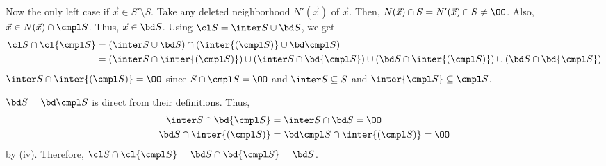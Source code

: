\documentclass[MAS241_Note.tex]{subfiles}
\begin{document}
{\begin{enumerate}[label=(\roman*), nolistsep]
            Now the only left case if $\vec x \in S' \setminus S$.
            Take any deleted neighborhood $N'(\vec x)$ of $\vec x$.
            Then, $N(\vec x) \cap S = N'(\vec x) \cap S \neq \OO$.
            Also, $\vec x \in N(\vec x) \cap \cmpl S$. Thus, $\vec x \in \bd S$.
        \ii Using $\cl S = \inter S \cup \bd S$, we get \[
                \begin{aligned}[t]
                    \cl S \cap \cl{\cmpl S} & = (\inter S \cup \bd S) \cap (\inter{(\cmpl S)} \cup \bd\cmpl S) \\
                                            & = (\inter S \cap \inter{(\cmpl S)}) \cup (\inter S \cap \bd{\cmpl S}) \cup
                                                (\bd S \cap \inter{(\cmpl S)}) \cup (\bd S \cap \bd{\cmpl S})
                \end{aligned}
            \]
            $\inter S \cap \inter{(\cmpl S)} = \OO$ since
            $S \cap \cmpl S = \OO$ and $\inter S \subseteq S$ and $\inter{\cmpl S} \subseteq \cmpl S$.\par
            $\bd S = \bd \cmpl S$ is direct from their definitions. Thus, \[
                \begin{aligned}[t]
                    \inter S \cap \bd{\cmpl S}   & = \inter S \cap \bd S = \OO \\
                    \bd S \cap \inter{(\cmpl S)} & = \bd \cmpl S \cap \inter{(\cmpl S)} = \OO
                \end{aligned}
            \]
            by (iv). Therefore, $\cl S \cap \cl{\cmpl S} = \bd S \cap \bd{\cmpl S} = \bd S$.
    \end{enumerate}
}


\end{document}
